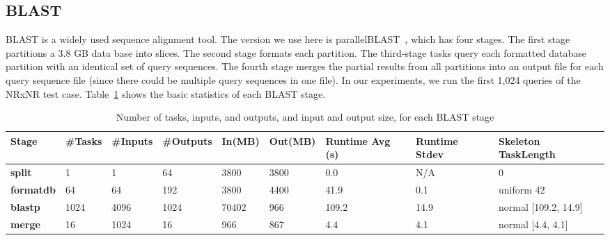 \documentclass[preprint,12pt]{elsarticle}
\newcommand{\katznote}[1]{ {\textcolor{blue}    { ***Dan:   #1 }}}
\newcommand{\zhaonote}[1]{{\textcolor{cyan}{ ***Zhao:  #1 }}}
\newcommand{\katznote}[1]{}
\newcommand{\zhaonote}[1]{}
\newcommand{\B}[1]{\textbf{#1}\xspace}
\newcommand{\N}{\newline}
\newcommand{\HF}{\hfill}
\begin{document}
\subsection{BLAST}

BLAST is a widely used sequence alignment tool. The version we use here is parallelBLAST~\cite{ParallelBlast}, which has four stages. The first stage partitions a 3.8 GB data base into slices. The second stage formats each 
partition. The third-stage tasks query each formatted database partition with an identical set of query sequences. The
fourth stage merges the partial results from all partitions into an output file for each query sequence file 
(since there could be multiple query sequences in one file). %
%
%
In our experiments, we run the first 1,024 queries of the NRxNR test case. 
Table~\ref{tb:blast-stats}
shows the basic statistics of each BLAST stage. 

\begin{table}[t]
\begin{center}
    \caption{Number of tasks, inputs, and outputs, and input and output size, for each BLAST stage}
    \begin{scriptsize}
    \begin{tabular}{ @{} p{1.4cm} @{}p{0.65cm} p{0.80cm} p{0.95cm} p{0.85cm} p{1.00cm} p{1.10cm} p{1.1cm} p{2.8cm}@{}}
    \toprule
    \B{Stage} & \B{\#\N Tasks} & \B{\#\N Inputs} & \B{\#\N Outputs} & \B{In\N (MB)} & \B{Out\N (MB)} & \B{Runtime Avg (s)} & \B{Runtime Stdev} & \B{Skeleton Task\N Length}\\
    \midrule
    \B{split   } & \HF    1 & \HF    1 & \HF   64 & \HF  3800 & \HF 3800 & \HF   0.0 & \HF  N/A &         \HF             0 \\
    \B{formatdb} & \HF   64 & \HF   64 & \HF  192 & \HF  3800 & \HF 4400 & \HF  41.9 & \HF  0.1 & uniform \HF            42 \\
    \B{blastp  } & \HF 1024 & \HF 4096 & \HF 1024 & \HF 70402 & \HF  966 & \HF 109.2 & \HF 14.9 & normal  \HF [109.2, 14.9] \\
    \B{merge   } & \HF   16 & \HF 1024 & \HF   16 & \HF   966 & \HF  867 & \HF   4.4 & \HF  4.1 & normal  \HF    [4.4, 4.1] \\
    \bottomrule
    \end{tabular}
    \end{scriptsize}
    \label{tb:blast-stats}
\end{center}   
\end{table}
\end{document}
